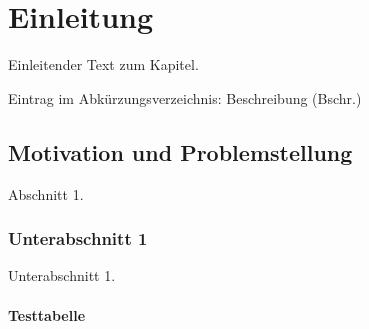 \chapter{Einleitung\label{chap1:Erstes-Kapitel}}

Einleitender Text zum Kapitel.

Eintrag im Abkürzungsverzeichnis: Beschreibung (Bschr.)

\section{Motivation und Problemstellung\label{sec1.1:Unterpunkt-1}}

Abschnitt 1.


\subsection{Unterabschnitt 1\label{sub1.1.1:Unterpunkt-2}}

Unterabschnitt 1.

\begin{table}[H]
    \subsubsection{\textrm{Testtabelle}}
    \caption[Text für Inhaltsverzeichnis]{Beschreibender Text für die Tabelle. \label{tab1.1:Beispieltabelle}}
\end{table}

